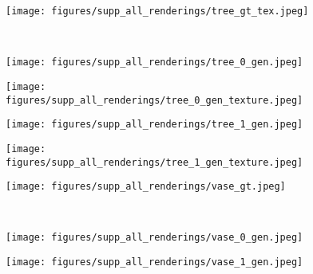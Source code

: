 \begin{figure*}[!h]
    \begin{subfigure}{.16\linewidth}
        \centering
        \texttt{[image: figures/supp\_all\_renderings/tree\_gt\_tex.jpeg]}
    \end{subfigure}
    \unskip\ \vrule\ 
    \begin{subfigure}{.16\linewidth}
        \centering
        \texttt{[image: figures/supp\_all\_renderings/tree\_0\_gen.jpeg]}
    \end{subfigure}
    \begin{subfigure}{.16\linewidth}
        \centering
        \texttt{[image: figures/supp\_all\_renderings/tree\_0\_gen\_texture.jpeg]}
    \end{subfigure}
    \begin{subfigure}{.16\linewidth}
        \centering
        \texttt{[image: figures/supp\_all\_renderings/tree\_1\_gen.jpeg]}
    \end{subfigure}
    \begin{subfigure}{.16\linewidth}
        \centering
        \texttt{[image: figures/supp\_all\_renderings/tree\_1\_gen\_texture.jpeg]}
    \end{subfigure}
    \vspace*{-5mm} 
    \begin{subfigure}{.315\linewidth}
        \centering
        \texttt{[image: figures/supp\_all\_renderings/vase\_gt.jpeg]}
    \end{subfigure}
    \unskip\ \vrule\ 
    \begin{subfigure}{.32\linewidth}
        \centering
        \texttt{[image: figures/supp\_all\_renderings/vase\_0\_gen.jpeg]}
    \end{subfigure}
    \begin{subfigure}{.32\linewidth}
        \centering
        \texttt{[image: figures/supp\_all\_renderings/vase\_1\_gen.jpeg]}
    \end{subfigure}

\end{figure*}
